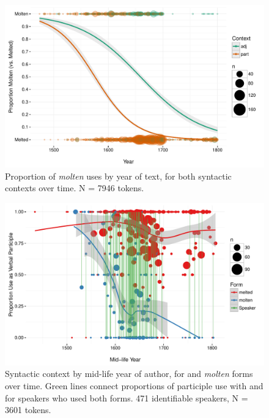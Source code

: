 \documentclass{artikel3}
\begin{document}
\begin{figure}
    \begin{center}
    \includegraphics[scale=.6]{FormByDateUnbinnedWithDots2.pdf}
    \caption{Proportion of \textsl{molten} uses by year of text, for both syntactic contexts over time. N =  7946 tokens.}
       \label{molten2}
    \end{center}
\end{figure}

\begin{figure}
    \begin{center}
    \includegraphics[scale=.6]{ContextByDateAuthor.pdf}
    \caption{Syntactic context by mid-life year of author, for  and \textsl{molten} forms over time. Green lines connect proportions of participle use with  and  for speakers who used both forms. 471 identifiable speakers, N = 3601 tokens.}
       \label{molten3}
    \end{center}
\end{figure}
\end{document}
